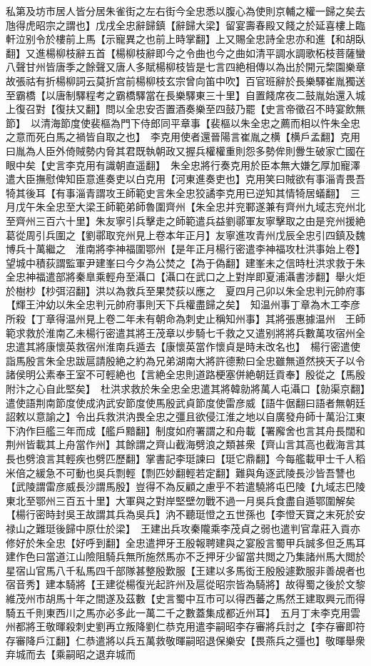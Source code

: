 私第及坊市居人皆分居朱雀街之左右街今全忠悉以腹心為使則京輔之權一歸之矣去虺得虎昭宗之謂也】戊戌全忠辭歸鎮【辭歸大梁】留宴壽春殿又餞之於延喜樓上臨軒泣别令於樓前上馬【示寵異之也前上時掌翻】上又賜全忠詩全忠亦和進【和胡臥翻】又進楊柳枝辭五首【楊柳枝辭即今之令曲也今之曲如清平調水調歌柘枝菩薩蠻八聲甘州皆唐季之餘聲又唐人多賦楊柳枝皆是七言四絶相傳以為出於開元棃園樂章故張祜有折楊柳詞云莫折宫前楊柳枝玄宗曾向笛中吹】百官班辭於長樂驛崔胤獨送至霸橋【以唐制驛程考之霸橋驛當在長樂驛東三十里】自置餞席夜二鼓胤始還入城上復召對【復扶又翻】問以全忠安否置酒奏樂至四鼓乃罷【史言帝徵召不時宴飲無節】　以清海節度使裴樞為門下侍郎同平章事【裴樞以朱全忠之薦而相以忤朱全忠之意而死白馬之禍皆自取之也】　李克用使者還晉陽言崔胤之横【横戶孟翻】克用曰胤為人臣外倚賊勢内脅其君既執朝政又握兵權權重則怨多勢侔則釁生破家亡國在眼中矣【史言李克用有識朝直遥翻】　朱全忠將行奏克用於臣本無大嫌乞厚加寵澤遣大臣撫慰俾知臣意進奏吏以白克用【河東進奏吏也】克用笑曰賊欲有事淄青畏吾犄其後耳【有事淄青謂攻王師範史言朱全忠狡譎李克用已逆知其情犄居蟻翻】　三月戊午朱全忠至大梁王師範弟師魯圍齊州【朱全忠并兖鄆遂兼有齊州九域志兖州北至齊州三百六十里】朱友寧引兵擊走之師範遣兵益劉鄩軍友寧擊取之由是兖州援絶葛從周引兵圍之【劉鄩取兖州見上卷本年正月】友寧進攻青州戊辰全忠引四鎮及魏博兵十萬繼之　淮南將李神福圍鄂州【是年正月楊行密遣李神福攻杜洪事始上卷】望城中積荻謂監軍尹建峯曰今夕為公焚之【為于偽翻】建峯未之信時杜洪求救于朱全忠神福遣部將秦臯乘輕舟至灄口【灄口在武口之上對岸即夏浦灄書涉翻】舉火炬於樹杪【杪弭沼翻】洪以為救兵至果焚荻以應之　夏四月己卯以朱全忠判元帥府事【輝王沖幼以朱全忠判元帥府事則天下兵權盡歸之矣】　知温州事丁章為木工李彦所殺【丁章得温州見上卷二年未有朝命為刺史止稱知州事】其將張惠據温州　王師範求救於淮南乙未楊行密遣其將王茂章以步騎七千救之又遣别將將兵數萬攻宿州全忠遣其將康懷英救宿州淮南兵遁去【康懷英當作懷貞是時未改名也】　楊行密遣使詣馬殷言朱全忠跋扈請殷絶之約為兄弟湖南大將許德勲曰全忠雖無道然挾天子以令諸侯明公素奉王室不可輕絶也【言絶全忠則道路梗塞併絶朝廷貢奉】殷從之【馬殷附汴之心自此堅矣】　杜洪求救於朱全忠全忠遣其將韓勍將萬人屯灄口【勍渠京翻】遣使語荆南節度使成汭武安節度使馬殷武貞節度使雷彦威【語牛倨翻曰語者無朝廷詔敕以意諭之】令出兵救洪汭畏全忠之彊且欲侵江淮之地以自廣發舟師十萬沿江東下汭作巨艦三年而成【艦戶黯翻】制度如府署謂之和舟載【署廨舍也言其舟長闊和荆州皆載其上舟當作州】其餘謂之齊山截海劈浪之類甚衆【齊山言其高也截海言其長也劈浪言其輕疾也劈匹歷翻】掌書記李珽諫曰【珽它鼎翻】今每艦載甲士千人稻米倍之緩急不可動也吳兵剽輕【剽匹妙翻輕若定翻】難與角逐武陵長沙皆吾讐也【武陵謂雷彦威長沙謂馬殷】豈得不為反顧之慮乎不若遣驍將屯巴陵【九域志巴陵東北至鄂州三百五十里】大軍與之對岸堅壁勿戰不過一月吳兵食盡自遁鄂圍解矣【楊行密時封吳王故謂其兵為吳兵】汭不聽珽憕之五世孫也【李憕天寶之末死於安禄山之難珽後歸中原仕於梁】　王建出兵攻秦隴乘李茂貞之弱也遣判官韋莊入貢亦修好於朱全忠【好呼到翻】全忠遣押牙王殷報聘建與之宴殷言蜀甲兵誠多但乏馬耳建作色曰當道江山險阻騎兵無所施然馬亦不乏押牙少留當共閲之乃集諸州馬大閲於星宿山官馬八千私馬四千部隊甚整殷歎服【王建以多馬衒王殷殷遽歎服非善覘者也宿音秀】建本騎將【王建從楊復光起許州及扈從昭宗皆為騎將】故得蜀之後於文黎維茂州市胡馬十年之間遂及茲數【史言蜀中互市可以得西蕃之馬然王建取興元而得騎五千則東西川之馬亦必多此一萬二千之數蓋集成都近州耳】　五月丁未李克用雲州都將王敬暉殺刺史劉再立叛降劉仁恭克用遣李嗣昭李存審將兵討之【李存審即符存審降戶江翻】仁恭遣將以兵五萬救敬暉嗣昭退保樂安【畏燕兵之彊也】敬暉舉衆弃城而去【乘嗣昭之退弃城而